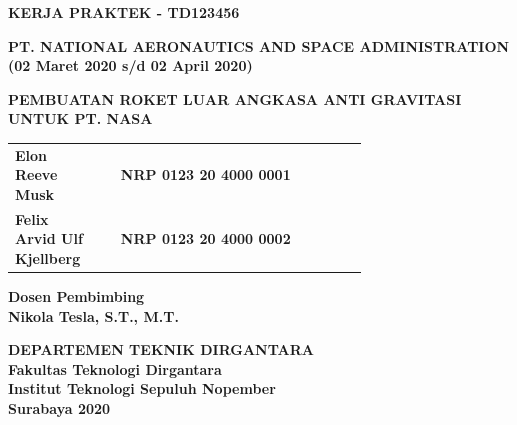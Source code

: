 \begin{flushleft}

  \sffamily
  \color{white}

  \noindent
  \textbf{KERJA PRAKTEK - TD123456}
  \vspace{4ex}

  \noindent
  {\large \textbf{PT. NATIONAL AERONAUTICS AND SPACE ADMINISTRATION}} \\
  \textbf{(02 Maret 2020 s/d 02 April 2020)}
  \vspace{6ex}

  \noindent
  {\large \textbf{PEMBUATAN ROKET LUAR ANGKASA ANTI GRAVITASI UNTUK PT. NASA}}
  \vspace{6ex}

  \begin{adjustwidth}{-0.2cm}{}
    \begin{tabular}{lcp{0.7\linewidth}}
      \textbf{Elon Reeve Musk} & & \textbf{NRP 0123 20 4000 0001} \\
      \textbf{Felix Arvid Ulf Kjellberg} & & \textbf{NRP 0123 20 4000 0002} \\
    \end{tabular}
  \end{adjustwidth}
  \vspace{4ex}

  \noindent
  \textbf{Dosen Pembimbing} \\
  \textbf{Nikola Tesla, S.T., M.T.}
  \vspace{12ex}

  \noindent
  \textbf{DEPARTEMEN TEKNIK DIRGANTARA} \\
  \textbf{Fakultas Teknologi Dirgantara} \\
  \textbf{Institut Teknologi Sepuluh Nopember} \\
  \textbf{Surabaya 2020}

\end{flushleft}

\restoregeometry